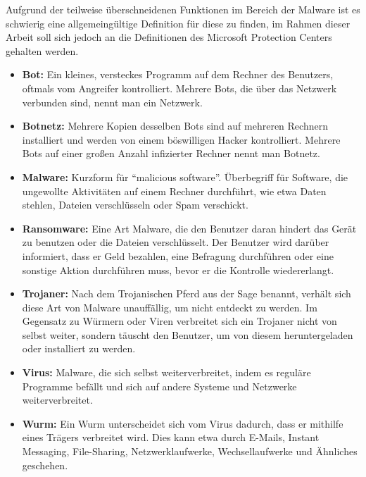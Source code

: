 Aufgrund der teilweise überschneidenen Funktionen im Bereich der Malware ist es schwierig eine allgemeingültige Definition für diese zu finden, im Rahmen dieser Arbeit soll sich jedoch an die Definitionen des Microsoft Protection Centers \cite{malware_pc} gehalten werden.

		\begin{itemize}
			\item \textbf{Bot:} Ein kleines, versteckes Programm auf dem Rechner des Benutzers, oftmals vom Angreifer kontrolliert. Mehrere Bots, die über das Netzwerk verbunden sind, nennt man ein Netzwerk.
			\item \textbf{Botnetz:} Mehrere Kopien des­sel­ben Bots sind auf mehreren Rechnern installiert und werden von einem böswilligen Hacker kontrolliert. Mehrere Bots auf einer großen Anzahl infizierter Rechner nennt man Botnetz.
			\item \textbf{Malware:}	Kurzform für ``malicious software''. Überbegriff für Software, die ungewollte Aktivitäten auf einem Rechner durchführt, wie etwa Daten stehlen, Dateien verschlüsseln oder Spam verschickt.
			\item \textbf{Ransomware:} Eine Art Malware, die den Benutzer daran hindert das Gerät zu benutzen oder die Dateien verschlüsselt. Der Benutzer wird darüber informiert, dass er Geld bezahlen, eine Befragung durchführen oder eine sonstige Aktion durchführen muss, bevor er die Kontrolle wiedererlangt.
			\item \textbf{Trojaner:} Nach dem Trojanischen Pferd aus der Sage benannt, verhält sich diese Art von Malware unauffällig, um nicht entdeckt zu werden. Im Gegensatz zu Würmern oder Viren verbreitet sich ein Trojaner nicht von selbst weiter, sondern täuscht den Benutzer, um von diesem heruntergeladen oder installiert zu werden.
			\item \textbf{Virus:} Malware, die sich selbst weiterverbreitet, indem es reguläre Programme befällt und sich auf andere Systeme und Netzwerke weiterverbreitet.
			\item \textbf{Wurm:} Ein Wurm unterscheidet sich vom Virus dadurch, dass er mithilfe eines Trägers verbreitet wird. Dies kann etwa durch E-Mails, Instant Messaging, File-Sharing, Netzwerklaufwerke, Wechsellaufwerke und Ähnliches geschehen.
		\end{itemize}